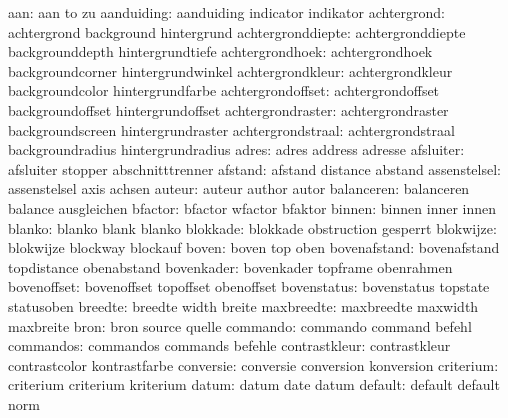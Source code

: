                  aan:  aan                  to                   zu
          aanduiding:  aanduiding           indicator            indikator
         achtergrond:  achtergrond          background           hintergrund
   achtergronddiepte:  achtergronddiepte    backgrounddepth      hintergrundtiefe
     achtergrondhoek:  achtergrondhoek      backgroundcorner     hintergrundwinkel
    achtergrondkleur:  achtergrondkleur     backgroundcolor      hintergrundfarbe
   achtergrondoffset:  achtergrondoffset    backgroundoffset     hintergrundoffset
   achtergrondraster:  achtergrondraster    backgroundscreen     hintergrundraster
   achtergrondstraal:  achtergrondstraal    backgroundradius     hintergrundradius
               adres:  adres                address              adresse
           afsluiter:  afsluiter            stopper              abschnitttrenner
             afstand:  afstand              distance             abstand
        assenstelsel:  assenstelsel         axis                 achsen
              auteur:  auteur               author               autor
          balanceren:  balanceren           balance              ausgleichen
             bfactor:  bfactor              wfactor              bfaktor
              binnen:  binnen               inner                innen
              blanko:  blanko               blank                blanko
            blokkade:  blokkade             obstruction          gesperrt
           blokwijze:  blokwijze            blockway             blockauf
               boven:  boven                top                  oben
        bovenafstand:  bovenafstand         topdistance          obenabstand
          bovenkader:  bovenkader           topframe             obenrahmen
         bovenoffset:  bovenoffset          topoffset            obenoffset
         bovenstatus:  bovenstatus          topstate             statusoben
             breedte:  breedte              width                breite
          maxbreedte:  maxbreedte           maxwidth            maxbreite
                bron:  bron                 source               quelle
            commando:  commando             command              befehl
           commandos:  commandos            commands             befehle
       contrastkleur:  contrastkleur        contrastcolor        kontrastfarbe
           conversie:  conversie            conversion           konversion
           criterium:  criterium            criterium            kriterium
               datum:  datum                date                 datum
             default:  default              default              norm
